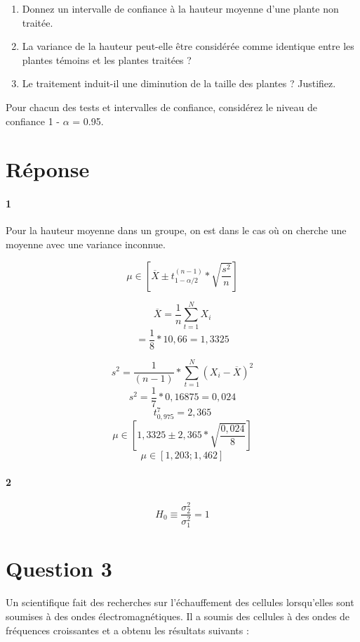 \documentclass[a4paper, 12pt]{article}
\begin{document}
  \begin{enumerate}
   \item Donnez un intervalle de confiance à la hauteur moyenne d'une plante non traitée.
   \item La variance de la hauteur peut-elle être considérée comme identique entre les plantes témoins et les plantes traitées ?
   \item Le traitement induit-il une diminution de la taille des plantes ? Justifiez.
  \end{enumerate}
  
  Pour chacun des tests et intervalles de confiance, considérez le niveau de confiance 1 - $\alpha$ = 0.95.
  
  \color{red!70}
  \section*{Réponse}
  \paragraph{1} Pour la hauteur moyenne dans un groupe, on est dans le cas où on cherche une moyenne avec une variance inconnue.
  
  \[
   \mu \in [\overline{X} \pm t^{(n-1)}_{1-\alpha/2} * \sqrt{\frac{s^{2}}{n}}]
  \]
  
  \[
   \overline{X} = \frac{1}{n} \sum_{t=1}^{N} X_{i}
  \]
  \[
   = \frac{1}{8} * 10,66 = 1,3325
  \]
  
  \[
   s^{2} = \frac{1}{(n-1)} * \sum_{t=1}^{N} (X_{i} - \overline{X})^{2}
  \]
  \[
   s^{2} = \frac{1}{7} * 0,16875 = 0,024
  \]
  \[
   t^{7}_{0,975} = 2,365
  \]
  \[
   \mu \in [1,3325 \pm 2,365 * \sqrt{\frac{0,024}{8}}]
  \]
  \[
   \mu \in [1,203;1,462]
  \]

  \paragraph{2}
  \[
   H_{0} \equiv \frac{\sigma_{2}^{2}}{\sigma_{1}^{2}} = 1
  \]

  
  
  \color{black}
  \section*{Question 3}
  Un scientifique fait des recherches sur l'échauffement des cellules lorsqu'elles sont soumises à des ondes électromagnétiques. Il a soumis des cellules à des ondes de fréquences croissantes et a obtenu les résultats suivants : \bigskip
  
\end{document}
